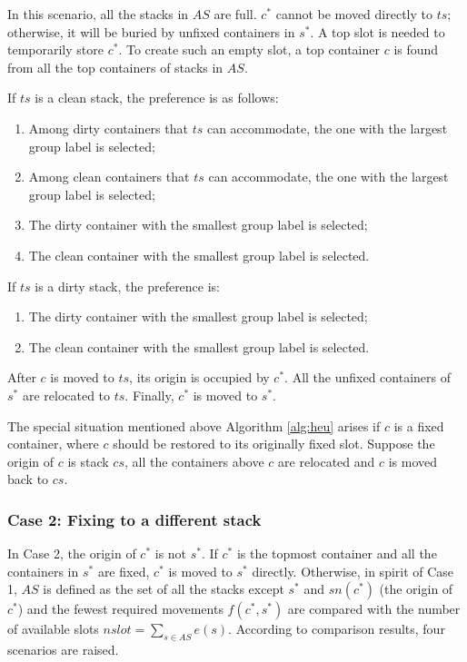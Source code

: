 \documentclass[review,3p,times,authoryear,12pt]{elsarticle}
\begin{document}
In this scenario, all the stacks in $\mathit{AS}$ are full.
$c^*$ cannot be moved directly to $\mathit{ts}$; otherwise, it will be buried by unfixed containers in $s^*$.
A top slot is needed to temporarily store $c^*$.
To create such an empty slot, a top container $c$ is found from all the top containers of stacks in $\mathit{AS}$.

If $\mathit{ts}$ is a clean stack, the preference is as follows:
\begin{enumerate}[1.]
\item Among dirty containers that $\mathit{ts}$ can accommodate, the one with the largest group label is selected;
\item Among clean containers that $\mathit{ts}$ can accommodate, the one with the largest group label is selected;
\item The dirty container with the smallest group label is selected;
\item The clean container with the smallest group label is selected.
\end{enumerate}

If $\mathit{ts}$ is a dirty stack, the preference is:
\begin{enumerate}[1.]
\item The dirty container with the smallest group label is selected;
\item The clean container with the smallest group label is selected.
\end{enumerate}

After $c$ is moved to $\mathit{ts}$, its origin is occupied by $c^*$.
All the unfixed containers of $s^*$ are relocated to $\mathit{ts}$.
Finally, $c^*$ is moved to $s^*$.

The special situation mentioned above Algorithm \ref{alg:heu} arises if $c$ is a fixed container, where $c$ should be restored to its originally fixed slot.
Suppose the origin of $c$ is stack $\mathit{cs}$, all the containers above $c$ are relocated and $c$ is moved back to $\mathit{cs}$.

\subsubsection{Case 2: Fixing to a different stack}

In Case 2, the origin of $c^*$ is not $s^*$.
If $c^*$ is the topmost container and all the containers in $s^*$ are fixed, $c^*$ is moved to $s^*$ directly.
Otherwise, in spirit of Case 1, $\mathit{AS}$ is defined as the set of all the stacks except $s^*$ and $\mathit{sn}(c^*)$ (the origin of $c^*$) and the fewest required movements $f(c^*,s^*)$ are compared with the number of available slots $\mathit{nslot}=\sum_{s\in \mathit{AS}}e(s)$.
According to comparison results, four scenarios are raised.
\end{document}
